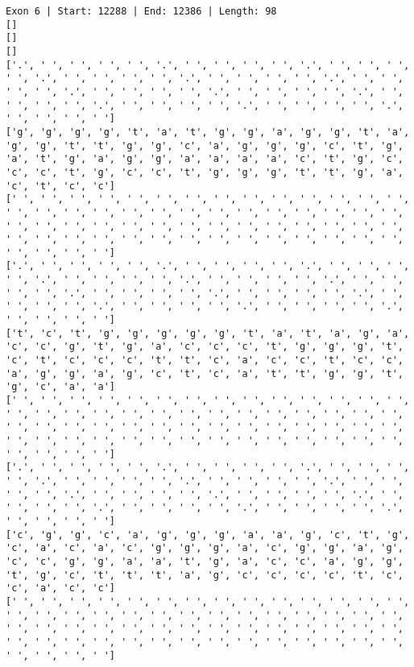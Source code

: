\documentclass{article}
\begin{document}
\begin{Verbatim}
Exon 6 | Start: 12288 | End: 12386 | Length: 98
[]
[]
[]
['.', ' ', ' ', ' ', ' ', '.', ' ', ' ', ' ', ' ', '.', ' ', ' ', ' ', ' ', '.', ' ', ' ', ' ', ' ', '.', ' ', ' ', ' ', ' ', '.', ' ', ' ', ' ', ' ', '.', ' ', ' ', ' ', ' ', '.', ' ', ' ', ' ', ' ', '.', ' ', ' ', ' ', ' ', '.', ' ', ' ', ' ', ' ', '.', ' ', ' ', ' ', ' ', '.', ' ', ' ', ' ', ' ']
['g', 'g', 'g', 'g', 't', 'a', 't', 'g', 'g', 'a', 'g', 'g', 't', 'a', 'g', 'g', 't', 't', 'g', 'g', 'c', 'a', 'g', 'g', 'g', 'c', 't', 'g', 'a', 't', 'g', 'a', 'g', 'g', 'a', 'a', 'a', 'a', 'c', 't', 'g', 'c', 'c', 'c', 't', 'g', 'c', 'c', 't', 'g', 'g', 'g', 't', 't', 'g', 'a', 'c', 't', 'c', 'c']
[' ', ' ', ' ', ' ', ' ', ' ', ' ', ' ', ' ', ' ', ' ', ' ', ' ', ' ', ' ', ' ', ' ', ' ', ' ', ' ', ' ', ' ', ' ', ' ', ' ', ' ', ' ', ' ', ' ', ' ', ' ', ' ', ' ', ' ', ' ', ' ', ' ', ' ', ' ', ' ', ' ', ' ', ' ', ' ', ' ', ' ', ' ', ' ', ' ', ' ', ' ', ' ', ' ', ' ', ' ', ' ', ' ', ' ', ' ', ' ']
['.', ' ', ' ', ' ', ' ', '.', ' ', ' ', ' ', ' ', '.', ' ', ' ', ' ', ' ', '.', ' ', ' ', ' ', ' ', '.', ' ', ' ', ' ', ' ', '.', ' ', ' ', ' ', ' ', '.', ' ', ' ', ' ', ' ', '.', ' ', ' ', ' ', ' ', '.', ' ', ' ', ' ', ' ', '.', ' ', ' ', ' ', ' ', '.', ' ', ' ', ' ', ' ', '.', ' ', ' ', ' ', ' ']
['t', 'c', 't', 'g', 'g', 'g', 'g', 'g', 't', 'a', 't', 'a', 'g', 'a', 'c', 'c', 'g', 't', 'g', 'a', 'c', 'c', 'c', 't', 'g', 'g', 'g', 't', 'c', 't', 'c', 'c', 'c', 't', 't', 'c', 'a', 'c', 'c', 't', 'c', 'c', 'a', 'g', 'g', 'a', 'g', 'c', 't', 'c', 'a', 't', 't', 'g', 'g', 't', 'g', 'c', 'a', 'a']
[' ', ' ', ' ', ' ', ' ', ' ', ' ', ' ', ' ', ' ', ' ', ' ', ' ', ' ', ' ', ' ', ' ', ' ', ' ', ' ', ' ', ' ', ' ', ' ', ' ', ' ', ' ', ' ', ' ', ' ', ' ', ' ', ' ', ' ', ' ', ' ', ' ', ' ', ' ', ' ', ' ', ' ', ' ', ' ', ' ', ' ', ' ', ' ', ' ', ' ', ' ', ' ', ' ', ' ', ' ', ' ', ' ', ' ', ' ', ' ']
['.', ' ', ' ', ' ', ' ', '.', ' ', ' ', ' ', ' ', '.', ' ', ' ', ' ', ' ', '.', ' ', ' ', ' ', ' ', '.', ' ', ' ', ' ', ' ', '.', ' ', ' ', ' ', ' ', '.', ' ', ' ', ' ', ' ', '.', ' ', ' ', ' ', ' ', '.', ' ', ' ', ' ', ' ', '.', ' ', ' ', ' ', ' ', '.', ' ', ' ', ' ', ' ', '.', ' ', ' ', ' ', ' ']
['c', 'g', 'g', 'c', 'a', 'g', 'g', 'g', 'a', 'a', 'g', 'c', 't', 'g', 'c', 'a', 'c', 'a', 'c', 'g', 'g', 'g', 'a', 'c', 'g', 'g', 'a', 'g', 'c', 'c', 'g', 'g', 'a', 'a', 't', 'g', 'a', 'c', 'c', 'a', 'g', 'g', 't', 'g', 'c', 't', 't', 't', 'a', 'g', 'c', 'c', 'c', 'c', 't', 'c', 'c', 'a', 'c', 'c']
[' ', ' ', ' ', ' ', ' ', ' ', ' ', ' ', ' ', ' ', ' ', ' ', ' ', ' ', ' ', ' ', ' ', ' ', ' ', ' ', ' ', ' ', ' ', ' ', ' ', ' ', ' ', ' ', ' ', ' ', ' ', ' ', ' ', ' ', ' ', ' ', ' ', ' ', ' ', ' ', ' ', ' ', ' ', ' ', ' ', ' ', ' ', ' ', ' ', ' ', ' ', ' ', ' ', ' ', ' ', ' ', ' ', ' ', ' ', ' ']

\end{Verbatim}
\end{document}

